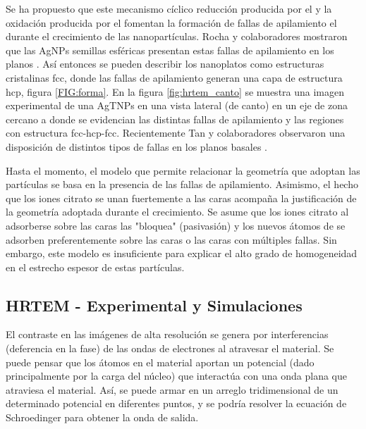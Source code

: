 Se ha propuesto que este mecanismo cíclico reducción producida por el  y la oxidación producida por el  fomentan la formación de fallas de apilamiento el durante el crecimiento de las nanopartículas. Rocha y colaboradores mostraron que las AgNPs semillas esféricas presentan estas fallas de apilamiento en los planos .\cite{rocha2007} Así entonces se pueden describir los nanoplatos como estructuras cristalinas fcc, donde las fallas de apilamiento generan una capa de estructura hcp, figura \ref{FIG:forma}. En la figura \ref{fig:hrtem_canto} se muestra una imagen experimental de una AgTNPs en una vista lateral (de canto) en un eje de zona cercano a \hkl[110] donde se evidencian las distintas fallas de apilamiento y las regiones con estructura fcc-hcp-fcc. Recientemente Tan y colaboradores observaron una disposición de distintos tipos de fallas en los planos basales .\cite{tan2021}

Hasta el momento, el modelo que permite relacionar la geometría que adoptan las partículas se basa en la presencia de las fallas de apilamiento. Asimismo, el hecho que los iones citrato se unan fuertemente a las caras  acompaña la justificación de la geometría adoptada durante el crecimiento. Se asume que los iones citrato al adsorberse sobre las caras  las "bloquea" (pasivasión) y los nuevos átomos de  se adsorben preferentemente sobre las caras  o las caras con múltiples fallas. Sin embargo, este modelo es insuficiente para explicar el alto grado de homogeneidad en el estrecho espesor de estas partículas. 


\subsection{HRTEM - Experimental y Simulaciones}

El contraste en las imágenes de alta resolución se genera por interferencias (deferencia en la fase) de las ondas de electrones al atravesar el material. Se puede pensar que los átomos en el material aportan un potencial (dado principalmente por la carga del núcleo) que interactúa con una onda plana que atraviesa el material. Así, se puede armar en un arreglo tridimensional de un determinado potencial en diferentes puntos, y se podría resolver la ecuación de Schroedinger para obtener la onda de salida. 

